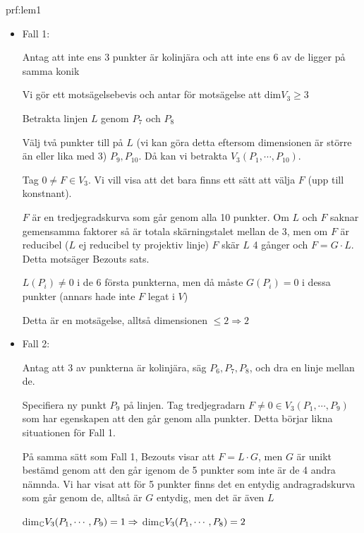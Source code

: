 \begin{prf}[Lemma 1]{prf:lem1}
  \begin{itemize}
    \item Fall 1:\par
      \noindent Antag att inte ens 3 punkter är kolinjära och att inte ens 6 av de ligger på samma konik\par
      \noindent Vi gör ett motsägelsebevis och antar för motsägelse att dim$V_3\geq3$ \par
      \noindent Betrakta linjen $L$ genom $P_7$ och $P_8$\par
      \noindent Välj två punkter till på $L$ (vi kan göra detta eftersom dimensionen är större än eller lika med 3) $P_9, P_{10}$. Då kan vi betrakta $V_3(P_1,\cdots,P_{10})$.\par
      \noindent Tag $0\neq F\in V_3$. Vi vill visa att det bara finns ett sätt att välja $F$ (upp till konstnant).\par
      \noindent $F$ är en tredjegradskurva som går genom alla 10 punkter. Om $L$ och $F$ saknar gemensamma faktorer så är totala skärningstalet mellan de 3, men om $F$ är reducibel ($L$ ej reducibel ty projektiv linje) $F$ skär $L$ 4 gånger och $F = G\cdot L$. Detta motsäger Bezouts sats. \par
      \noindent $L(P_i)\neq0$ i de 6 första punkterna, men då måste $G(P_i)=0$ i dessa punkter (annars hade inte $F$ legat i $V$)\par
      \noindent Detta är en motsägelse, alltså dimensionen $\leq 2\Rightarrow 2$
    \item Fall 2:\par
      \noindent Antag att 3 av punkterna är kolinjära, säg $P_6,P_7,P_8$, och dra en linje mellan de.\par
      \noindent Specifiera ny punkt $P_9$ på linjen. Tag tredjegradarn $F\neq0\in V_3(P_1,\cdots, P_9)$ som har egenskapen att den går genom alla punkter. Detta börjar likna situationen för Fall 1. \par
      \noindent På samma sätt som Fall 1, Bezouts visar att $F = L\cdot G$, men $G$ är unikt bestämd genom att den går igenom de 5 punkter som inte är de 4 andra nämnda. Vi har visat att för 5 punkter finns det en entydig andragradskurva som går genom de, alltså är $G$ entydig, men det är även $L$\par
      \noindent dim$_{\mathbb{C}} V_3(P_1,\cdots,P_9)=1\Rightarrow$ dim$_{\mathbb{C}} V_3(P_1,\cdots, P_8)=2$
  \end{itemize}
\end{prf}
